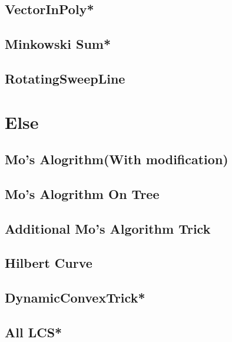 \subsection{VectorInPoly*} %

\subsection{Minkowski Sum*} %

\subsection{RotatingSweepLine}


\section{Else}
\subsection{Mo's Alogrithm(With modification)}

\subsection{Mo's Alogrithm On Tree}

\subsection{Additional Mo's Algorithm Trick}

\subsection{Hilbert Curve}

\subsection{DynamicConvexTrick*} %

%
\subsection{All LCS*} %

% 

